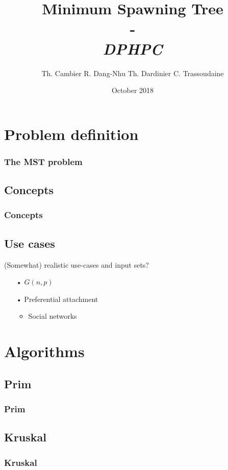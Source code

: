 \documentclass{beamer}
\institute[ETH Zürich]{\textbf{ETH Zürich}}
\date{October 2018}
\author{
    Th. Cambier
    R. Dang-Nhu
    Th. Dardinier
    C. Trassoudaine
}
\title{
	\textbf{Minimum Spawning Tree}\\
	-\\ 
	\textit{DPHPC}
}
\begin{document}
\frame{\titlepage}
\frame{\tableofcontents}


\section{Problem definition}
\begin{frame}
\frametitle{The MST problem}
\end{frame}

\subsection{Concepts}
\begin{frame}
\frametitle{Concepts}
\end{frame}

\subsection{Use cases}

\begin{frame}
(Somewhat) realistic use-cases and input sets?

\begin{itemize}
\item[•] $G(n, p)$
\item[•] Preferential attachment
	\begin{itemize}
	\item Social networks
	\end{itemize}
\end{itemize}
\end{frame}


\section{Algorithms}
\subsection{Prim}
\begin{frame}
\frametitle{Prim}
\end{frame}
\subsection{Kruskal}
\begin{frame}
\frametitle{Kruskal}
\end{frame}
\end{document}

